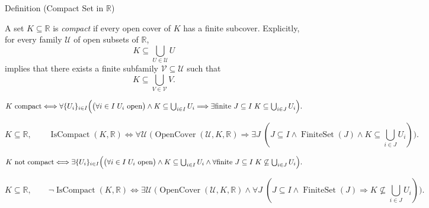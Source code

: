 \begin{definitionbox}{Definition (Compact Set in $\mathbb{R}$)}
\begin{definition}
\label{def:compact-set}
A set $K\subseteq\mathbb{R}$ is \emph{compact} if every open cover of $K$ has
a finite subcover.  Explicitly, for every family $\mathcal{U}$ of open
subsets of $\mathbb{R}$,
\[
  K\subseteq\bigcup_{U\in\mathcal{U}}U
\]
implies that there exists a finite subfamily $\mathcal{V}\subseteq\mathcal{U}$
such that
\[
  K\subseteq\bigcup_{V\in\mathcal{V}}V.
\]
\end{definition}
\end{definitionbox}
\begin{remark*}
\[
K \text{ compact} \Longleftrightarrow \forall \{U_i\}_{i\in I}\Bigl(\bigl(\forall i\in I\;U_i \text{ open}\bigr)\land K\subseteq\textstyle\bigcup_{i\in I}U_i \Longrightarrow \exists \text{finite } J\subseteq I\;K\subseteq\textstyle\bigcup_{i\in J}U_i\Bigr).
\]
\end{remark*}

\begin{remark*}
\[
K\subseteq\mathbb{R},\qquad
\operatorname{IsCompact}(K,\mathbb{R})
\Longleftrightarrow
\forall \mathcal{U}\;\bigl(\operatorname{OpenCover}(\mathcal{U},K,\mathbb{R})
\Longrightarrow \exists J\;(J\subseteq I\land \operatorname{FiniteSet}(J)
\land K\subseteq\textstyle\bigcup_{i\in J}U_i)\bigr).
\]
\end{remark*}
\begin{remark*}
\[
K \text{ not compact} \Longleftrightarrow \exists \{U_i\}_{i\in I}\Bigl(\bigl(\forall i\in I\;U_i \text{ open}\bigr)\land K\subseteq\textstyle\bigcup_{i\in I}U_i \land \forall \text{finite } J\subseteq I\;K\not\subseteq\textstyle\bigcup_{i\in J}U_i\Bigr).
\]
\end{remark*}
\begin{remark*}
\[
K\subseteq\mathbb{R},\qquad
\neg\operatorname{IsCompact}(K,\mathbb{R})
\Longleftrightarrow
\exists \mathcal{U}\;\bigl(\operatorname{OpenCover}(\mathcal{U},K,\mathbb{R})
\land \forall J\;(J\subseteq I\land \operatorname{FiniteSet}(J)
\Longrightarrow K\not\subseteq\textstyle\bigcup_{i\in J}U_i)\bigr).
\]
\end{remark*}

